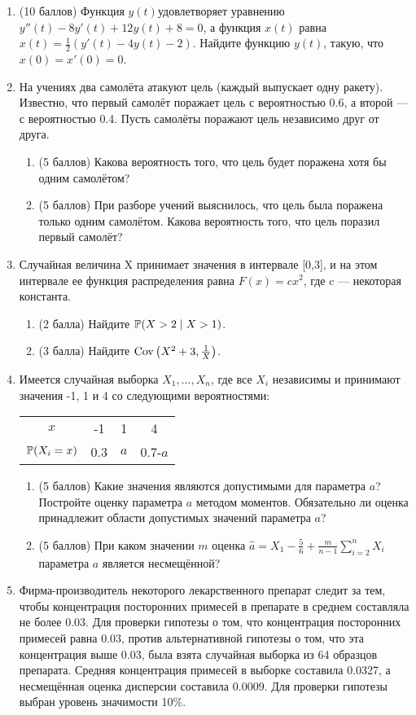 \documentclass[pdftex,12pt,a4paper]{article}
\begin{document}
\begin{enumerate}
\item (10 баллов) Функция $y(t)$удовлетворяет уравнению $y''(t)-8y'(t)+12y(t)+8=0$, а функция $x(t)$ равна $x(t)=\frac{1}{2}(y'(t)-4y(t)-2)$. Найдите функцию  $y(t)$, такую, что $x(0)=x'(0)=0$.\\
\item На учениях два самолёта атакуют цель (каждый выпускает одну ракету). Известно, что первый самолёт поражает цель с вероятностью 0.6, а второй --- с вероятностью 0.4. Пусть самолёты поражают цель независимо друг от друга.
\begin{enumerate}
\item (5 баллов) Какова вероятность того, что цель будет поражена хотя бы одним самолётом?
\item (5 баллов) При разборе учений выяснилось, что цель была поражена только одним самолётом. Какова вероятность того, что цель поразил первый самолёт?
\end{enumerate}
\item Случайная величина X принимает значения в интервале [0,3], и на этом интервале ее функция распределения равна $F(x)=cx^2$, где c --- некоторая константа.
\begin{enumerate}
\item (2 балла) Найдите  $\P(X>2\mid X>1)$.
\item (3 балла) Найдите $\Cov\left(X^2+3,\frac{1}{X}\right)$.
\end{enumerate}
\item Имеется случайная выборка $X_1,...,X_n$, где все  $X_i$ независимы и принимают значения -1, 1 и 4 со следующими вероятностями:\\
\begin{tabular}{cccc}
\hline
$x$ & -1 & 1 & 4\\
$\P(X_i=x)$ & 0.3 & $a$ & 0.7-$a$\\
\hline
\end{tabular}
 \begin{enumerate}
 \item (5 баллов) Какие значения являются допустимыми для параметра $a$? Постройте оценку параметра $a$ методом моментов. Обязательно ли оценка принадлежит области допустимых значений параметра $a$?
 \item (5 баллов) При каком значении $m$ оценка $\hat{a}=X_1-\frac{5}{6}+\frac{m}{n-1}\sum_{i=2}^n X_i$ параметра $a$ является несмещённой?
 \end{enumerate}
\item Фирма-производитель некоторого лекарственного препарат следит за тем, чтобы концентрация посторонних примесей в препарате в среднем составляла не более 0.03. Для проверки гипотезы о том, что концентрация посторонних примесей равна 0.03, против альтернативной гипотезы о том, что эта концентрация выше 0.03, была взята случайная выборка из 64 образцов препарата. Средняя концентрация примесей в выборке составила 0.0327, а несмещённая оценка дисперсии составила 0.0009. Для проверки гипотезы выбран уровень значимости 10\%.

\end{enumerate}
\end{document}
